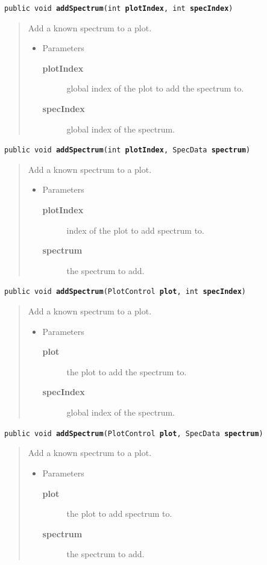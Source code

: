\documentclass[twoside,11pt]{article}
\renewcommand{\_}{\texttt{\symbol{95}}}
\newcommand{\method}[1]{\texttt{#1}}
\newenvironment{desc}{\begin{quote}}{\end{quote}}
\begin{document}
\method{public void \textbf{addSpectrum}(\texttt{int} \textbf{plotIndex},
\texttt{int} \textbf{specIndex})\label{l271}\label{l272}}
\begin{desc}Add a known spectrum to a plot.
\begin{itemize}
\item{Parameters
  \begin{description}
   \item[\textbf{plotIndex}]{global index of the plot to add the spectrum to.}
   \item[\textbf{specIndex}]{global index of the spectrum.}
  \end{description}}
\end{itemize}
\end{desc}

\method{public void \textbf{addSpectrum}(\texttt{int} \textbf{plotIndex},
\texttt{SpecData} \textbf{spectrum})\label{l273}\label{l274}}
\begin{desc}Add a known spectrum to a plot.
\begin{itemize}
\item{Parameters
  \begin{description}
   \item[\textbf{plotIndex}]{index of the plot to add spectrum to.}
   \item[\textbf{spectrum}]{the spectrum to add.}
  \end{description}}
\end{itemize}
\end{desc}

\method{public void \textbf{addSpectrum}(\texttt{PlotControl} \textbf{plot}, \texttt{int} \textbf{specIndex})\label{l275}\label{l276}}
\begin{desc}Add a known spectrum to a plot.
\begin{itemize}
\item{Parameters
  \begin{description}
   \item[\textbf{plot}]{the plot to add the spectrum to.}
   \item[\textbf{specIndex}]{global index of the spectrum.}
  \end{description}}
\end{itemize}
\end{desc}

\method{public void \textbf{addSpectrum}(\texttt{PlotControl} \textbf{plot}, \texttt{SpecData} \textbf{spectrum})\label{l277}\label{l278}}
\begin{desc}Add a known spectrum to a plot.
\begin{itemize}
\item{Parameters
  \begin{description}
   \item[\textbf{plot}]{the plot to add spectrum to.}
   \item[\textbf{spectrum}]{the spectrum to add.}
  \end{description}}
\end{itemize}
\end{desc}
\end{document}
